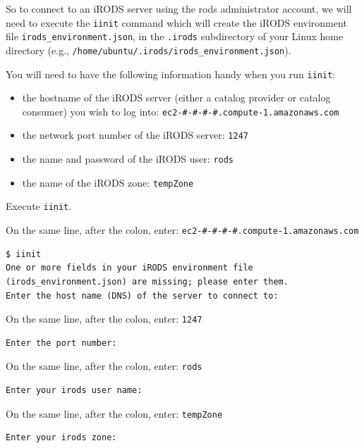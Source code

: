 \documentclass[10pt,oneside]{memoir}
\begin{document}
So to connect to an iRODS server using the rods administrator account, we will need to execute the \texttt{iinit} command which will create the iRODS environment file \texttt{irods\_environment.json}, in the \texttt{.irods} subdirectory of your Linux home directory (e.g., \texttt{/home/ubuntu/.irods/irods\_environment.json}).

\newpage

You will need to have the following information handy when you run \texttt{iinit}:
\begin{itemize}
 \item the hostname of the iRODS server (either a catalog provider or catalog consumer) you wish to log into: \texttt{ec2-\#-\#-\#-\#.compute-1.amazonaws.com}
 \item the network port number of the iRODS server: \texttt{1247}
 \item the name and password of the iRODS user: \texttt{rods}
 \item the name of the iRODS zone: \texttt{tempZone}
\end{itemize}

Execute \texttt{iinit}.

On the same line, after the colon, enter: \texttt{ec2-\#-\#-\#-\#.compute-1.amazonaws.com}

\begin{lstlisting}[basicstyle=\scriptsize\ttfamily]
$ iinit
One or more fields in your iRODS environment file (irods_environment.json) are missing; please enter them.
Enter the host name (DNS) of the server to connect to:
\end{lstlisting}

On the same line, after the colon, enter: \texttt{1247}

\begin{lstlisting}[basicstyle=\scriptsize\ttfamily]
Enter the port number:
\end{lstlisting}

On the same line, after the colon, enter: \texttt{rods}

\begin{lstlisting}[basicstyle=\scriptsize\ttfamily]
Enter your irods user name:
\end{lstlisting}

On the same line, after the colon, enter: \texttt{tempZone}

\begin{lstlisting}[basicstyle=\scriptsize\ttfamily]
Enter your irods zone:
\end{lstlisting}
\end{document}
